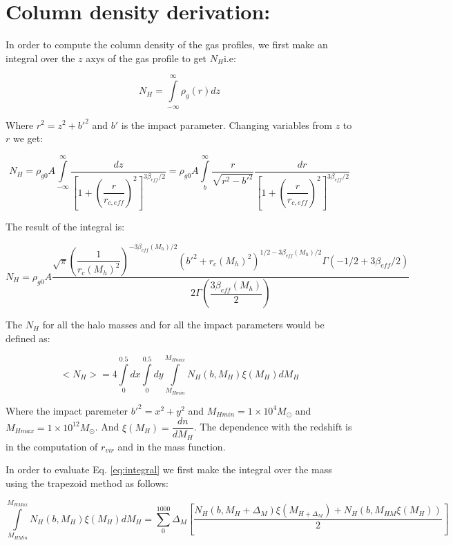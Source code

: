 \documentclass[12pt]{article}
\begin{document}
\section{Column density derivation:}

In order to compute the column density of the gas profiles, we first 
make an integral over the $z$ axys of the gas profile to get $N_{H}$i.e:

\begin{equation}
N_{H} = \int \limits_{-\infty}^{\infty}\rho_g(r)dz
\end{equation}

Where $r^2 = z^2 + b'^2$ and $b'$ is the impact parameter.
Changing variables from $z$ to $r$ we get: 

\begin{equation}
N_{H} = \rho_{g0}A \int \limits_{-\infty}^{\infty} \dfrac{dz}{\left 
[ 1 + \left(\dfrac{r}{r_{c,eff}} \right)^2 \right]^{3\beta_{eff}/2}}
= \rho_{g0}A \int \limits_{b}^{\infty}\dfrac{r}{\sqrt{r^2 - b'^2}}\dfrac{dr}
{\left [ 1 + \left(\dfrac{r}{r_{c,eff}} \right)^2 \right]^{3\beta_{eff}/2}} 
\end{equation}

The result of the integral is:

\begin{equation}
N_{H} = \rho_{g0} A\dfrac{\sqrt{\pi} (\dfrac{1}{r_c(M_h)^2})^{-3\beta_{eff}(M_h) /2} (b'^2 + r_c(M_h)^2)^{1/2 - 3\beta_{eff}(M_h)/2} \Gamma(-1/2 + 3\beta_{eff}/2) }{2 \Gamma(\dfrac{3\beta_{eff}(M_h)}{2})}  
\end{equation}

The $N_H$ for all the halo masses and for all the impact parameters would 
be defined as:

\begin{equation}\label{eq:integral}
<N_H> = 4 \int \limits_0^{0.5} dx \int \limits_{0}^{0.5}dy \int 
\limits_{M_{Hmin}}^{M_{Hmax}} N_H(b, M_H)\xi(M_H)dM_H  
\end{equation}

Where the impact paremeter $b'^2 = x^2  + y^2$ and $M_{Hmin} = 1\times 10^4 
M_{\odot}$ and $M_{Hmax} = 1\times 10^{12}M_{\odot}$. And $\xi(M_H)= \dfrac{dn}
{dM_H}$. The dependence with the redshift is in the computation of $r_{vir}$ and
in the mass function.

In order to evaluate  Eq. \ref{eq:integral} we first make the integral over 
the mass using the trapezoid method as follows: 

\begin{equation}
\int \limits_{M_{HMin}}^{M_{HMax}} N_H(b, M_H)\xi(M_H)dM_H =  \sum_{0}^{1000}\Delta_M \left[ \dfrac{N_H(b, M_{H}+\Delta_M) \xi(M_{H + \Delta_M}) + N_H(b, M_{HM}\xi(M_{H}))}{2}\right]
\end{equation}
\end{document}
